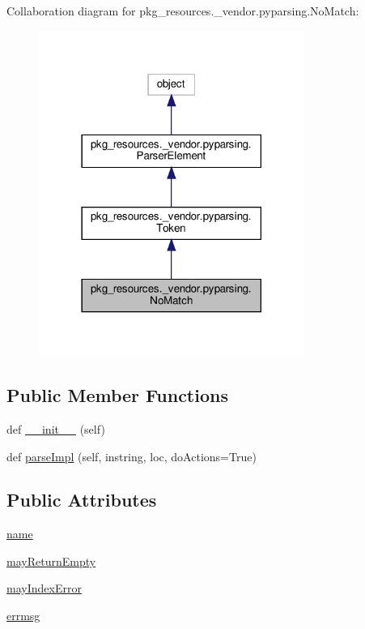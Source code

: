 Collaboration diagram for pkg\+\_\+resources.\+\_\+vendor.\+pyparsing.\+No\+Match\+:
\nopagebreak
\begin{figure}[H]
\begin{center}
\leavevmode
\includegraphics[width=246pt]{classpkg__resources_1_1__vendor_1_1pyparsing_1_1NoMatch__coll__graph}
\end{center}
\end{figure}
\subsection*{Public Member Functions}
\begin{DoxyCompactItemize}
\item 
def \hyperlink{classpkg__resources_1_1__vendor_1_1pyparsing_1_1NoMatch_a29475dfbd1bb637def2004784099c028}{\+\_\+\+\_\+init\+\_\+\+\_\+} (self)
\item 
def \hyperlink{classpkg__resources_1_1__vendor_1_1pyparsing_1_1NoMatch_ab7f6922ad9c6da0f0ec43495c311c8ae}{parse\+Impl} (self, instring, loc, do\+Actions=True)
\end{DoxyCompactItemize}
\subsection*{Public Attributes}
\begin{DoxyCompactItemize}
\item 
\hyperlink{classpkg__resources_1_1__vendor_1_1pyparsing_1_1NoMatch_ad6959859e1396e991c7fe2eed2e17c87}{name}
\item 
\hyperlink{classpkg__resources_1_1__vendor_1_1pyparsing_1_1NoMatch_acd7a2b95d75976694875f30528655872}{may\+Return\+Empty}
\item 
\hyperlink{classpkg__resources_1_1__vendor_1_1pyparsing_1_1NoMatch_a0f6ac6114eec05b18a803b1451e2639a}{may\+Index\+Error}
\item 
\hyperlink{classpkg__resources_1_1__vendor_1_1pyparsing_1_1NoMatch_a51441bc458a6c10425a544188c904748}{errmsg}
\end{DoxyCompactItemize}
